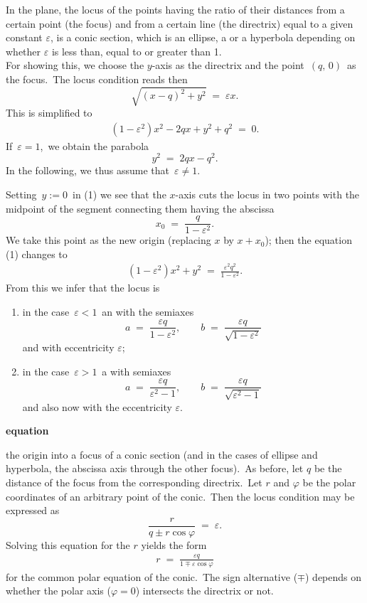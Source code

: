 \documentclass[12pt]{article}
\theoremstyle{definition}
\begin{document}
In the plane, the locus of the points having the ratio of their distances from a certain point (the focus) and from a certain line (the directrix) equal to a given constant $\varepsilon$, is a conic section, which is an ellipse, a  or a hyperbola depending on whether $\varepsilon$ is less than, equal to or greater than 1.\\

For showing this, we choose the $y$-axis as the directrix and the point \,$(q,\,0)$\, as the focus.\, The locus condition reads then
$$\sqrt{(x-q)^2+y^2} \;=\; \varepsilon x.$$
This is simplified to
\begin{align}
(1-\varepsilon^2)x^2-2qx+y^2+q^2 \;=\; 0.
\end{align}
If\, $\varepsilon = 1$,\, we obtain the parabola
$$y^2 \;=\; 2qx-q^2.$$
In the following, we thus assume that\, $\varepsilon \neq 1$.

Setting\, $y := 0$\, in (1) we see that the $x$-axis cuts the locus in two points with the midpoint of the segment connecting them having the abscissa
$$x_0 \;=\; \frac{q}{1-\varepsilon^2}.$$
We take this point as the new origin (replacing $x$ by $x+x_0$); then the equation (1) changes to
\begin{align}
(1-\varepsilon^2)x^2+y^2 \;=\; \frac{\varepsilon^2q^2}{1-\varepsilon^2}.
\end{align}
From this we infer that the locus is
\begin{enumerate}
\item in the case\, $\varepsilon < 1$\, an  with the semiaxes
$$a \;=\; \frac{\varepsilon q}{1-\varepsilon^2}, \qquad b \;=\; \frac{\varepsilon q}{\sqrt{1-\varepsilon^2}}$$
and with eccentricity $\varepsilon$;
\item in the case\, $\varepsilon > 1$\, a  with semiaxes
$$a \;=\; \frac{\varepsilon q}{\varepsilon^2-1}, \qquad b \;=\; \frac{\varepsilon q}{\sqrt{\varepsilon^2-1}}$$
and also now with the eccentricity $\varepsilon$.\\
\end{enumerate}

\textbf{ equation}

 the origin into a focus of a conic section (and in the cases of ellipse and hyperbola, the abscissa axis through the other focus).\, As before, let $q$ be the distance of the focus from the corresponding directrix.\, Let $r$ and $\varphi$ be the polar coordinates of an arbitrary point of the conic.\, Then the locus condition may be expressed as
$$\frac{r}{q\pm r\cos{\varphi}} \;=\; \varepsilon.$$
Solving this equation for the  $r$ yields the form
\begin{align}
r \;=\; \frac{\varepsilon q}{1\mp \varepsilon\cos{\varphi}}
\end{align}
for the common polar equation of the conic.\, The sign alternative ($\mp$) depends on whether the polar axis ($\varphi = 0$) intersects the directrix or not.


\end{document}
